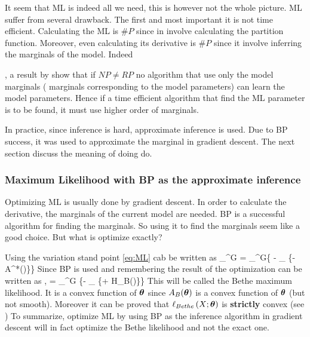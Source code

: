 It seem that ML is indeed all we need, this is however not the whole picture.
ML suffer from several drawback.
The first and most important it is not time efficient.
Calculating the ML is $\#P$ since in involve calculating the partition function.
Moreover, even calculating its derivative is $\#P$ since it involve inferring the marginals of the model.
Indeed , a result by \cite{bresler2014hardness,montanari2015computational} show that if $NP \neq RP$ no algorithm that use only the model marginals ( marginals corresponding to the model parameters) can learn the model parameters. 
Hence if a time efficient algorithm that find the ML parameter is to be found, it must use higher order of marginals.

In practice, since inference is hard, approximate inference is used.
Due to BP success, it was used to approximate the marginal in gradient descent.
The next section discuss the meaning of doing do.
\subsubsection{Maximum Likelihood with BP as the approximate inference}
Optimizing ML is usually done by gradient descent.
In order to calculate the derivative, the marginals of the current model are needed.
BP is a successful algorithm for finding the marginals.
So using it to find the marginals seem like a good choice.
But what is optimize exactly?

Using the variation stand point \eqref{eq:ML} cab be written as
\be
\sup_{\thetav \in \Omega^G}  = \sup_{\thetav \in \Omega^G}\left\{ \mubv \cdot \thetav - \sup_{\muv \in \margpoly} \left\{\muv \cdot \thetav - A^*(\muv)\right\}\right\}
\ee
Since BP is used and remembering the result of \cite{yedidia2000generalized} the optimization can be written as ,
\be
{}  = \sup_{\thetav \in \Omega^G} \left\{\mubv \cdot \thetav - \sup_{\tauv \in \lclmargpoly} \left\{\tauv \cdot \thetav + H_B(\tauv)\right\}\right\}
\ee
This will be called the Bethe maximum likelihood.
It is a convex function of $\boldsymbol{\theta}$ since $A_B(\boldsymbol{\theta})$ is a convex function of $\boldsymbol{\theta}$ (but not smooth).
Moreover it can be proved that $\ell_{Bethe}\left(X; \boldsymbol{\theta}\right)$ is \textbf{strictly} convex (see \appref{})
To summarize, optimize ML by using BP as the inference algorithm in gradient descent will in fact optimize the Bethe likelihood and not the exact one.

